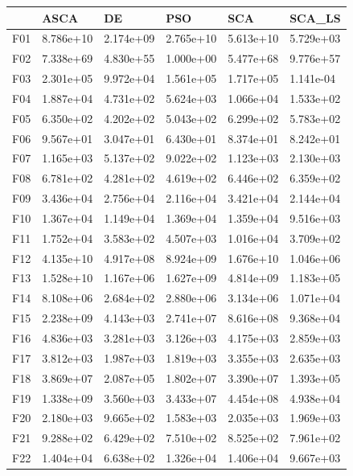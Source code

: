\begin{tabular}{llllll}
\toprule
{} &       ASCA &         DE &        PSO &        SCA &     SCA\_LS \\
\midrule
F01  &  8.786e+10 &  2.174e+09 &  2.765e+10 &  5.613e+10 &  5.729e+03 \\
F02  &  7.338e+69 &  4.830e+55 &  1.000e+00 &  5.477e+68 &  9.776e+57 \\
F03  &  2.301e+05 &  9.972e+04 &  1.561e+05 &  1.717e+05 &  1.141e-04 \\
F04  &  1.887e+04 &  4.731e+02 &  5.624e+03 &  1.066e+04 &  1.533e+02 \\
F05  &  6.350e+02 &  4.202e+02 &  5.043e+02 &  6.299e+02 &  5.783e+02 \\
F06  &  9.567e+01 &  3.047e+01 &  6.430e+01 &  8.374e+01 &  8.242e+01 \\
F07  &  1.165e+03 &  5.137e+02 &  9.022e+02 &  1.123e+03 &  2.130e+03 \\
F08  &  6.781e+02 &  4.281e+02 &  4.619e+02 &  6.446e+02 &  6.359e+02 \\
F09  &  3.436e+04 &  2.756e+04 &  2.116e+04 &  3.421e+04 &  2.144e+04 \\
F10  &  1.367e+04 &  1.149e+04 &  1.369e+04 &  1.359e+04 &  9.516e+03 \\
F11  &  1.752e+04 &  3.583e+02 &  4.507e+03 &  1.016e+04 &  3.709e+02 \\
F12  &  4.135e+10 &  4.917e+08 &  8.924e+09 &  1.676e+10 &  1.046e+06 \\
F13  &  1.528e+10 &  1.167e+06 &  1.627e+09 &  4.814e+09 &  1.183e+05 \\
F14  &  8.108e+06 &  2.684e+02 &  2.880e+06 &  3.134e+06 &  1.071e+04 \\
F15  &  2.238e+09 &  4.143e+03 &  2.741e+07 &  8.616e+08 &  9.368e+04 \\
F16  &  4.836e+03 &  3.281e+03 &  3.126e+03 &  4.175e+03 &  2.859e+03 \\
F17  &  3.812e+03 &  1.987e+03 &  1.819e+03 &  3.355e+03 &  2.635e+03 \\
F18  &  3.869e+07 &  2.087e+05 &  1.802e+07 &  3.390e+07 &  1.393e+05 \\
F19  &  1.338e+09 &  3.560e+03 &  3.433e+07 &  4.454e+08 &  4.938e+04 \\
F20  &  2.180e+03 &  9.665e+02 &  1.583e+03 &  2.035e+03 &  1.969e+03 \\
F21  &  9.288e+02 &  6.429e+02 &  7.510e+02 &  8.525e+02 &  7.961e+02 \\
F22  &  1.404e+04 &  6.638e+02 &  1.326e+04 &  1.406e+04 &  9.667e+03 \\

\end{tabular}
